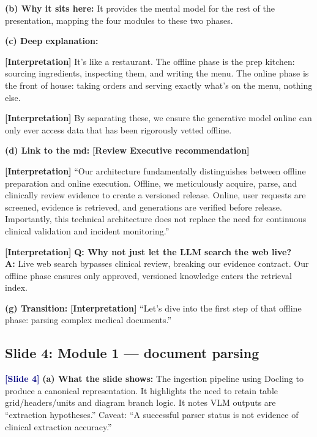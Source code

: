 \documentclass[11pt,a4paper]{article}
\newcommand{\origintag}[2]{\textcolor{#1}{\small\textbf{[#2]}}}
\begin{document}
\textbf{(b) Why it sits here:} It provides the mental model for the rest of the presentation, mapping the four modules to these two phases.

\textbf{(c) Deep explanation:}
\begin{analogy}
\origintag{slate}{Interpretation} It's like a restaurant. The offline phase is the prep kitchen: sourcing ingredients, inspecting them, and writing the menu. The online phase is the front of house: taking orders and serving exactly what's on the menu, nothing else.
\end{analogy}
\origintag{slate}{Interpretation} By separating these, we ensure the generative model online can only ever access data that has been rigorously vetted offline.

\textbf{(d) Link to the md:} \origintag{amber}{Review Executive recommendation}

\begin{sayit}
\origintag{slate}{Interpretation} ``Our architecture fundamentally distinguishes between offline preparation and online execution. Offline, we meticulously acquire, parse, and clinically review evidence to create a versioned release. Online, user requests are screened, evidence is retrieved, and generations are verified before release. Importantly, this technical architecture does not replace the need for continuous clinical validation and incident monitoring.''
\end{sayit}

\begin{qa}
\origintag{slate}{Interpretation} \textbf{Q: Why not just let the LLM search the web live?} \\
\textbf{A:} Live web search bypasses clinical review, breaking our evidence contract. Our offline phase ensures only approved, versioned knowledge enters the retrieval index.
\end{qa}
\textbf{(g) Transition:} \origintag{slate}{Interpretation} ``Let's dive into the first step of that offline phase: parsing complex medical documents.''

\subsection{Slide 4: Module 1 --- document parsing}
\origintag{navy}{Slide 4}
\textbf{(a) What the slide shows:} The ingestion pipeline using Docling to produce a canonical representation. It highlights the need to retain table grid/headers/units and diagram branch logic. It notes VLM outputs are ``extraction hypotheses.'' Caveat: ``A successful parser status is not evidence of clinical extraction accuracy.''
\end{document}
